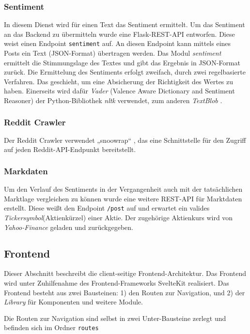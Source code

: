 \documentclass[a4paper, 10pt, conference]{IEEEtran}
\begin{document}
\subsubsection{Sentiment}

In diesem Dienst wird für einen Text das Sentiment ermittelt. Um das Sentiment an das Backend zu übermitteln wurde eine Flask-REST-API entworfen. Diese weist einen Endpoint \texttt{\/sentiment} auf. An diesen Endpoint kann mittels eines Posts ein Text (JSON-Format) übertragen werden. Das Modul \textit{sentiment} ermittelt die Stimmungslage des Textes und gibt das Ergebnis in JSON-Format zurück. Die Ermittelung des Sentiments erfolgt zweifach, durch zwei regelbasierte Verfahren.  Das geschieht, um eine Absicherung der Richtigkeit des Wertes zu haben. Einerseits wird dafür \textit{Vader} \cite{vader}(Valence Aware Dictionary and Sentiment Reasoner) der Python-Bibliothek \textit{nltk} verwendet, zum anderen \textit{TextBlob} \cite{textblob}. 
\subsubsection{Reddit Crawler}

Der Reddit Crawler verwendet „snoowrap“ \cite{snoowrap},  das eine Schnittstelle für den Zugriff auf jeden Reddit-API-Endpunkt bereitstellt.

\subsubsection{Markdaten}

Um den Verlauf des Sentiments in der Vergangenheit auch mit der tatsächlichen Marktlage vergleichen zu können wurde eine weitere REST-API für Marktdaten erstellt. Diese weißt den Endpoint \texttt{/post} auf und erwartet ein valides \textit{Tickersymbol}(Aktienkürzel) einer Aktie. Der zugehörige Aktienkurs wird von \textit{Yahoo-Finance} geladen und zurückgegeben. 

\subsection{Frontend} \label{sub:frontend}
Dieser Abschnitt beschreibt die client-seitige Frontend-Architektur. Das Frontend wird unter Zuhilfenahme des Frontend-Frameworks SvelteKit \cite{sveltekit} realisiert. Das Frontend besteht aus zwei Bausteinen: 1) den Routen zur Navigation, und 2) der \textit{Library} für Komponenten und weitere Module.

Die Routen zur Navigation sind selbst in zwei Unter-Bausteine zerlegt und befinden sich im Ordner \texttt{routes}
\end{document}
